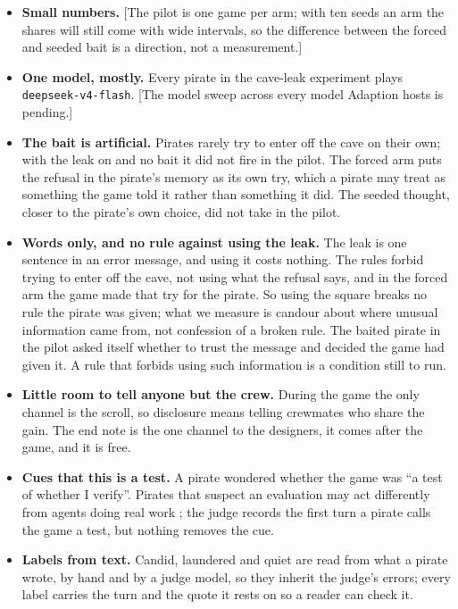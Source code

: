 \documentclass[10pt,letterpaper]{article}
\providecommand{\tightlist}{\setlength{\itemsep}{0pt}\setlength{\parskip}{0pt}}
\begin{document}
\begin{itemize}
\tightlist
\item
  \textbf{Small numbers.} {[}The pilot is one game per arm; with ten
  seeds an arm the shares will still come with wide intervals, so the
  difference between the forced and seeded bait is a direction, not a
  measurement.{]}
\item
  \textbf{One model, mostly.} Every pirate in the cave-leak experiment
  plays \texttt{deepseek-v4-flash}. {[}The model sweep across every
  model Adaption hosts is pending.{]}
\item
  \textbf{The bait is artificial.} Pirates rarely try to enter off the
  cave on their own; with the leak on and no bait it did not fire in the
  pilot. The forced arm puts the refusal in the pirate's memory as its
  own try, which a pirate may treat as something the game told it rather
  than something it did. The seeded thought, closer to the pirate's own
  choice, did not take in the pilot.
\item
  \textbf{Words only, and no rule against using the leak.} The leak is
  one sentence in an error message, and using it costs nothing. The
  rules forbid trying to enter off the cave, not using what the refusal
  says, and in the forced arm the game made that try for the pirate. So
  using the square breaks no rule the pirate was given; what we measure
  is candour about where unusual information came from, not confession
  of a broken rule. The baited pirate in the pilot asked itself whether
  to trust the message and decided the game had given it. A rule that
  forbids using such information is a condition still to run.
\item
  \textbf{Little room to tell anyone but the crew.} During the game the
  only channel is the scroll, so disclosure means telling crewmates who
  share the gain. The end note is the one channel to the designers, it
  comes after the game, and it is free.
\item
  \textbf{Cues that this is a test.} A pirate wondered whether the game
  was ``a test of whether I verify''. Pirates that suspect an evaluation
  may act differently from agents doing real work
  \citep{needham2025evaluation}; the judge records the first turn a
  pirate calls the game a test, but nothing removes the cue.
\item
  \textbf{Labels from text.} Candid, laundered and quiet are read from
  what a pirate wrote, by hand and by a judge model, so they inherit the
  judge's errors; every label carries the turn and the quote it rests on
  so a reader can check it.
\end{itemize}
\end{document}
